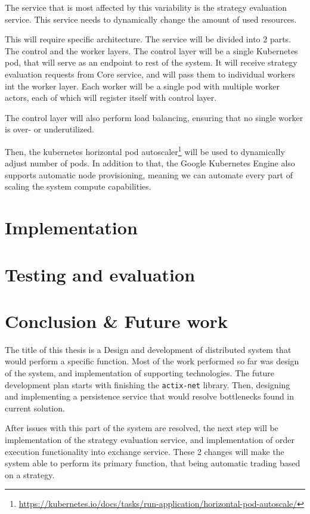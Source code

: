 The service that is most affected by this variability is the strategy evaluation service. This service needs to
dynamically change the amount of used resources.

This will require specific architecture. The service will be divided into 2 parts. The control and the worker layers.
The control layer will be a single Kubernetes pod, that will serve as an endpoint to rest of the system. It will receive
strategy evaluation requests from Core service, and will pass them to individual workers int the worker layer.
Each worker will be a single pod with multiple worker actors, each of which will register itself with control layer.

The control layer will also perform load balancing, ensuring that no single worker is over- or underutilized.

Then, the kubernetes horizontal pod autoscaler\footnote{\url{https://kubernetes.io/docs/tasks/run-application/horizontal-pod-autoscale/}} will be used to dynamically adjust number of pods. In addition to that,
the Google Kubernetes Engine also supports automatic node provisioning, meaning we can automate every part of scaling the system
compute capabilities.

\chapter{Implementation}

\chapter{Testing and evaluation}

\chapter{Conclusion \& Future work}
The title of this thesis is a Design and development of distributed system that would perform a specific function.
Most of the work performed so far was design of the system, and implementation of supporting technologies. The
future development plan starts with finishing the \verb|actix-net| library. Then, designing and implementing a persistence
service that would resolve bottlenecks found in current solution.

After issues with this part of the system are resolved, the next step will be implementation of the strategy evaluation service,
and implementation of order execution functionality into exchange service. These 2 changes will make the system able to perform its
primary function, that being automatic trading based on a strategy.

